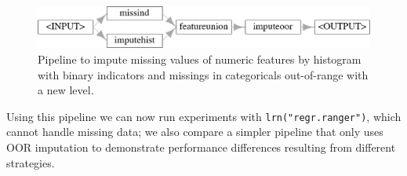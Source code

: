 \begin{Shaded}
\begin{Highlighting}[]
\OtherTok{=} \NormalTok{(}
      \NormalTok{(}\NormalTok{, } \NormalTok{,}
           \NormalTok{(}\NormalTok{)}
\NormalTok{      ),}
      \NormalTok{(}\NormalTok{, } \NormalTok{(}\NormalTok{))}
\NormalTok{    ) }\SpecialCharTok{\%\textgreater{}\textgreater{}\%}
    \NormalTok{(}\NormalTok{) }\SpecialCharTok{\%\textgreater{}\textgreater{}\%}
    \NormalTok{(}\NormalTok{, } \NormalTok{(}\NormalTok{))}

\SpecialCharTok{$}\NormalTok{(} \NormalTok{)}
\end{Highlighting}
\end{Shaded}

\begin{figure}

{\centering \includegraphics[width=1\textwidth,height=\textheight]{chapters/chapter9/preprocessing_files/figure-pdf/fig-impute-1.png}

}

\caption{\label{fig-impute}Pipeline to impute missing values of numeric
features by histogram with binary indicators and missings in
categoricals out-of-range with a new level.}

\end{figure}

Using this pipeline we can now run experiments with
\texttt{lrn("regr.ranger")}, which cannot handle missing data; we also
compare a simpler pipeline that only uses OOR imputation to demonstrate
performance differences resulting from different strategies.

